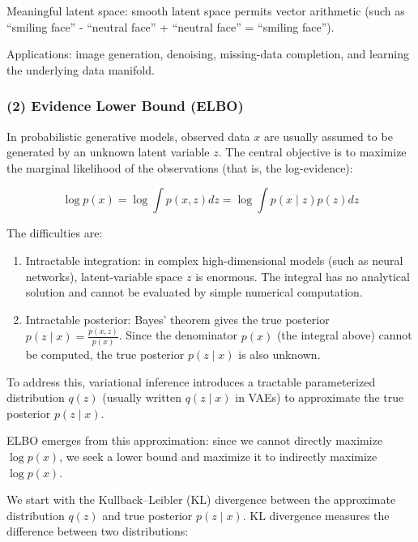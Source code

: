 Meaningful latent space: smooth latent space permits vector arithmetic (such as ``smiling face'' - ``neutral face'' + ``neutral face'' = ``smiling face'').

Applications: image generation, denoising, missing-data completion, and learning the underlying data manifold.

\hypertarget{evidence-lower-bound-elbo}{%
\subsubsection{(2) Evidence Lower Bound (ELBO)}\label{evidence-lower-bound-elbo}}

In probabilistic generative models, observed data \(x\) are usually assumed to be generated by an unknown latent variable \(z\). The central objective is to maximize the marginal likelihood of the observations (that is, the log-evidence):

\[
\log p(x)=\log\int p(x,z)dz=\log\int p(x\mid z)p(z)dz
\]

The difficulties are:

\begin{enumerate}
\def\labelenumi{\arabic{enumi}.}
\tightlist
\item
  Intractable integration: in complex high-dimensional models (such as neural networks), latent-variable space \(z\) is enormous. The integral has no analytical solution and cannot be evaluated by simple numerical computation.
\item
  Intractable posterior: Bayes' theorem gives the true posterior \(p(z\mid x)=\frac{p(x,z)}{p(x)}\). Since the denominator \(p(x)\) (the integral above) cannot be computed, the true posterior \(p(z\mid x)\) is also unknown.
\end{enumerate}

To address this, variational inference introduces a tractable parameterized distribution \(q(z)\) (usually written \(q(z\mid x)\) in VAEs) to approximate the true posterior \(p(z\mid x)\).

ELBO emerges from this approximation: since we cannot directly maximize \(\log p(x)\), we seek a lower bound and maximize it to indirectly maximize \(\log p(x)\).

We start with the Kullback--Leibler (KL) divergence between the approximate distribution \(q(z)\) and true posterior \(p(z\mid x)\). KL divergence measures the difference between two distributions:


